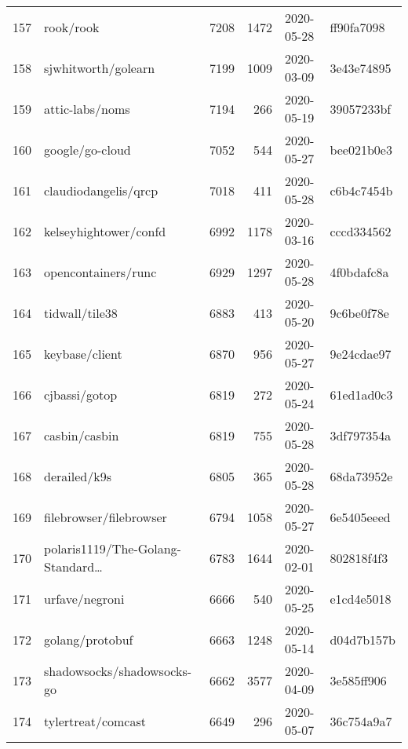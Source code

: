 \begin{longtable}{llrrll}
    157 &                                          rook/rook &   7208 &   1472 & 2020-05-28 &  ff90fa7098 \\
    158 &                                sjwhitworth/golearn &   7199 &   1009 & 2020-03-09 &  3e43e74895 \\
    159 &                                    attic-labs/noms &   7194 &    266 & 2020-05-19 &  39057233bf \\
    160 &                                    google/go-cloud &   7052 &    544 & 2020-05-27 &  bee021b0e3 \\
    161 &                               claudiodangelis/qrcp &   7018 &    411 & 2020-05-28 &  c6b4c7454b \\
    162 &                              kelseyhightower/confd &   6992 &   1178 & 2020-03-16 &  cccd334562 \\
    163 &                                opencontainers/runc &   6929 &   1297 & 2020-05-28 &  4f0bdafc8a \\
    164 &                                     tidwall/tile38 &   6883 &    413 & 2020-05-20 &  9c6be0f78e \\
    165 &                                     keybase/client &   6870 &    956 & 2020-05-27 &  9e24cdae97 \\
    166 &                                      cjbassi/gotop &   6819 &    272 & 2020-05-24 &  61ed1ad0c3 \\
    167 &                                      casbin/casbin &   6819 &    755 & 2020-05-28 &  3df797354a \\
    168 &                                       derailed/k9s &   6805 &    365 & 2020-05-28 &  68da73952e \\
    169 &                            filebrowser/filebrowser &   6794 &   1058 & 2020-05-27 &  6e5405eeed \\
    170 &              polaris1119/The-Golang-Standard\ldots &   6783 &   1644 & 2020-02-01 &  802818f4f3 \\
    171 &                                     urfave/negroni &   6666 &    540 & 2020-05-25 &  e1cd4e5018 \\
    172 &                                    golang/protobuf &   6663 &   1248 & 2020-05-14 &  d04d7b157b \\
    173 &                         shadowsocks/shadowsocks-go &   6662 &   3577 & 2020-04-09 &  3e585ff906 \\
    174 &                                 tylertreat/comcast &   6649 &    296 & 2020-05-07 &  36c754a9a7 \\

\end{longtable}

